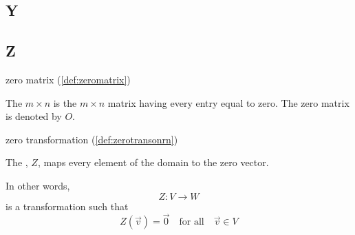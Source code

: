 \documentclass{ximera}
\begin{document}
\subsection{Y}

\subsection{Z}

zero matrix (\ref{def:zeromatrix})
\begin{expandable}
    The $m\times n$  is the $m\times n$ matrix
having every entry equal to zero. The zero matrix is
denoted by $O$.
\end{expandable}

zero transformation (\ref{def:zerotransonrn})
\begin{expandable}
    The , $Z$, maps every element of the domain to the zero vector.

In other words,
$$Z:V\rightarrow W$$ is a transformation such that $$Z(\vec{v})=\vec{0}\quad\text{for all}\quad \vec{v} \in V$$
\end{expandable}
\end{document}
